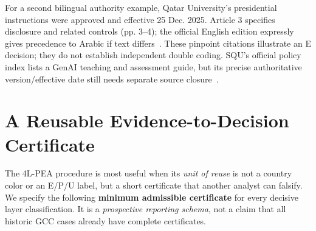 \documentclass[conference,letterpaper]{IEEEtran}
\begin{document}
For a second bilingual authority example, Qatar University's presidential instructions were approved and effective 25 Dec. 2025. Article 3 specifies disclosure and related controls (pp. 3--4); the official English edition expressly gives precedence to Arabic if text differs~\cite{qataru}. These pinpoint citations illustrate an E decision; they do not establish independent double coding. SQU's official policy index lists a GenAI teaching and assessment guide, but its precise authoritative version/effective date still needs separate source closure~\cite{squ}.


\section{A Reusable Evidence-to-Decision Certificate}
\label{sec:certificate}
The 4L-PEA procedure is most useful when its \emph{unit of reuse} is not a country color or an E/P/U label, but a short certificate that another analyst can falsify. We specify the following \textbf{minimum admissible certificate} for every decisive layer classification. It is a \emph{prospective reporting schema}, not a claim that all historic GCC cases already have complete certificates.
\end{document}
